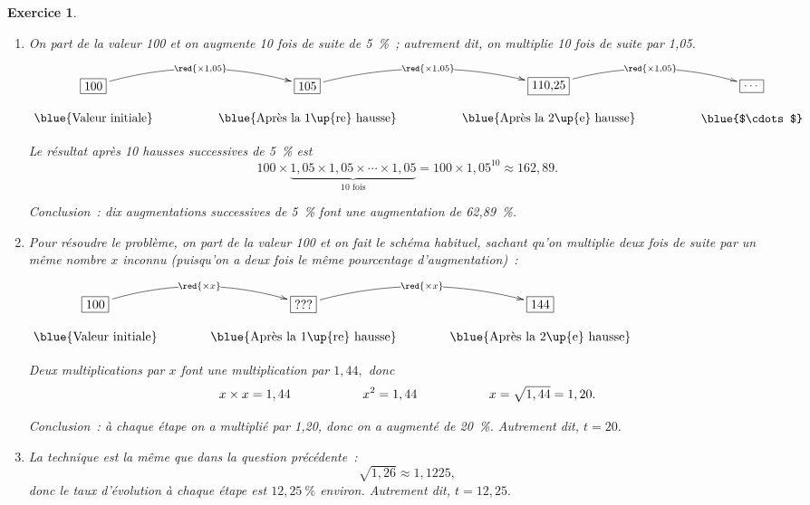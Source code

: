 \documentclass[10pt]{article}
\newtheorem{exo}{Exercice}
\begin{document}
\begin{exo}
\begin{enumerate}
\item On part de la valeur 100 et on augmente 10 fois de suite de 5~\%~; autrement dit, on multiplie 10 fois de suite par 1,05.


\begin{center}
$\xymatrix@R=0.5pc@C=4pc{
    *+[F]+\txt{100} \ar@/^0.5cm/[r]|{\red{\times 1,05}} & 
    *+[F]+\txt{105} \ar@/^0.5cm/[r]|{\red{\times 1,05}} & *+[F]+\txt{110,25} \ar@/^0.5cm/[r]|{\red{\times 1,05}}&*+[F]+\txt{$\cdots$}\\
    \txt{\blue{Valeur initiale}}&
    \txt{\blue{Après la 1\up{re} hausse}}&\txt{\blue{Après la 2\up{e} hausse}}&
    \txt{\blue{$\cdots$}}}$
    
    \end{center}
    
    Le résultat après 10 hausses successives de 5~\% est
    \[100\times \underbrace{1,05\times 1,05\times \cdots\times 1,05}_{\text{10 fois}}=100\times 1,05^{10}\approx 162,89.\]
    
    Conclusion~: dix augmentations successives de 5~\% font une augmentation de 62,89~\%.
\item Pour résoudre le problème, on part de la valeur 100 et on fait le schéma habituel, sachant qu'on multiplie deux fois de suite par un même nombre $x$ inconnu (puisqu'on a deux fois le même pourcentage d'augmentation)~:
   
   \begin{center}
    $\xymatrix@R=0.5pc@C=3pc{
    *+[F]+{100} \ar@/^0.5cm/[r]|{\red{\times x}} & 
    *+[F]+{???} \ar@/^0.5cm/[r]|{\red{\times x}} & *+[F]+{144} \\
    \txt{\blue{Valeur initiale}}&
    \txt{\blue{Après la 1\up{re} hausse}}&\txt{\blue{Après la 2\up{e} hausse}}
    }$
    \end{center}
    
    Deux multiplications par $x$ font une multiplication par $1,44,$ donc
    \[x\times x=1,44\hspace*{2cm} x^2=1,44 \hspace*{2cm} x=\sqrt{1,44}=1,20.\]
    
    \medskip
    
    Conclusion~: à chaque étape on a multiplié par 1,20, donc on a augmenté de 20~\%. Autrement dit, $t=20.$
    
    
\item La technique est la même que dans la question précédente~:
\[\sqrt{1,26}\approx 1,1225,\] donc le taux d'évolution à chaque étape est $12,25~\%$ environ. Autrement dit, $t=12,25.$

\end{enumerate}

\end{exo}
\end{document}
